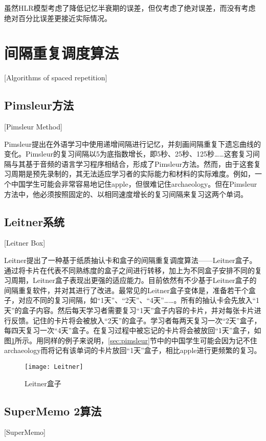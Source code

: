 虽然HLR模型考虑了降低记忆半衰期的误差，但仅考虑了绝对误差，而没有考虑绝对百分比误差更接近实际情况。

\section{间隔重复调度算法}[Algorithms of spaced repetition]

\subsection{Pimsleur方法}[Pimsleur Method]\label{sec:pimsleur}

Pimsleur提出在外语学习中使用递增间隔进行记忆，并刻画间隔重复下遗忘曲线的变化\cite{pimsleurMemorySchedule1967}。Pimsleur的复习间隔以5为底指数增长，即5秒、25秒、125秒……这套复习间隔与其基于音频的语言学习程序相结合，形成了Pimsleur方法。然而，由于这套复习周期是预先录制的，其无法适应学习者的实际能力和材料的实际难度。例如，一个中国学生可能会非常容易地记住apple，但很难记住archaeology。但在Pimsleur方法中，他必须按照固定的、以相同速度增长的复习间隔来复习这两个单词。

\subsection{Leitner系统}[Leitner Box]

Leitner提出了一种基于纸质抽认卡和盒子的间隔重复调度算法——Leitner盒子\cite{leitnerLerntManLeben1974}。通过将卡片在代表不同熟练度的盒子之间进行转移，加上为不同盒子安排不同的复习周期，Leitner盒子表现出更强的适应能力。目前依然有不少基于Leitner盒子的间隔重复软件，并对其进行了改进。最常见的Leitner盒子变体是，准备若干个盒子，对应不同的复习间隔，如“1天”、“2天”、“4天”……。所有的抽认卡会先放入“1天”的盒子内容。然后每天学习者需要复习“1天”盒子内容的卡片，并对每张卡片进行反馈。记住的卡片将会被放入“2天”的盒子。学习者每两天复习一次“2天”盒子，每四天复习一次“4天”盒子。在复习过程中被忘记的卡片将会被放回“1天”盒子，如图\ref{fig:leitner}所示。用同样的例子来说明，\ref{sec:pimsleur}节中的中国学生可能会因为记不住archaeology而将记有该单词的卡片放回“1天”盒子，相比apple进行更频繁的复习。

\begin{figure}[htbp]
    \centering
    \texttt{[image: Leitner]}
    \caption{Leitner盒子}
    \label{fig:leitner}
\end{figure}

\subsection{SuperMemo 2算法}[SuperMemo]

